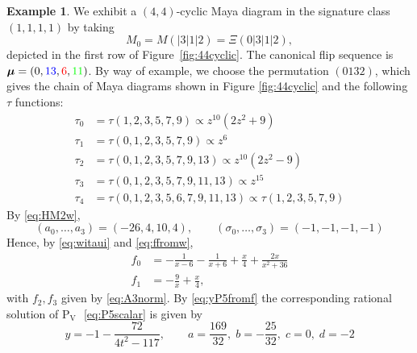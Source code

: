 \documentclass{amsart}
\theoremstyle{definition}
\newtheorem*{example}{Example} %
\newcommand{\bmu}{{\boldsymbol{\mu}}}
\newcommand{\PV}{$\mathrm{P}_{\mathrm{V}}\,\,$}
\begin{document}
\begin{example}\label{ex:44}
  We exhibit a $(4,4)$-cyclic Maya diagram in the signature class
  $(1,1,1,1)$ by taking
  \[M_0=M(|3|1|2)=\Xi(0|3|1|2),\] depicted in the first row of
  Figure~\ref{fig:44cyclic}.  The canonical flip sequence is
  $\bmu=(0,{\color{blue}13},{\color{red}6},{\color{green}11})$.  By
  way of example, we choose the permutation 
  $(0132)$, which gives the chain of Maya diagrams shown in Figure
  \ref{fig:44cyclic} and the following $\tau$ functions:
  \begin{align*}
    \tau_0 &= \tau(1,2,3,5,7,9) \propto z^{10}(2z^2+9)\\
    \tau_1 &= \tau(0,1,2,3,5,7,9)\propto z^{6} \\
    \tau_2 &= \tau(0,1,2,3,5,7,9,13)\propto z^{10}(2z^2-9)\\
    \tau_3 &= \tau(0,1,2,3,5,7,9,11,13)\propto z^{15}\\
    \tau_4 &= \tau(0,1,2,3,5,6,7,9,11,13)\propto \tau(1,2,3,5,7,9)
  \end{align*}
  By \eqref{eq:HM2w},
  \[ (a_0,\ldots, a_3) = (-26,4,10,4),\qquad (\sigma_0,\ldots,
    \sigma_3) = (-1,-1,-1,-1) \] Hence, by \eqref{eq:witaui} and
  \eqref{eq:ffromw},
  \[
    \begin{aligned}
      f_0 &= -\frac{1}{x-6} -\frac{1}{x+6}+\frac{x}{4}+ \frac{2x}{x^2+36}\\
      f_1 &= -\frac{9}{x} +\frac{x}{4},
    \end{aligned}\] with $f_2,f_3$ given by \eqref{eq:A3norm}. By
  \eqref{eq:yP5fromf} the corresponding rational solution of \PV
  \eqref{eq:P5scalar} is given by
  \[
    y = -1 -\frac{72}{4t^2-117},\qquad a= \frac{169}{32},\; b= -\frac{25}{32},\;
    c=0,\; d= -2
    \]

  \begin{figure}[ht]
    \centering
\end{figure}
\end{example}
\end{document}
